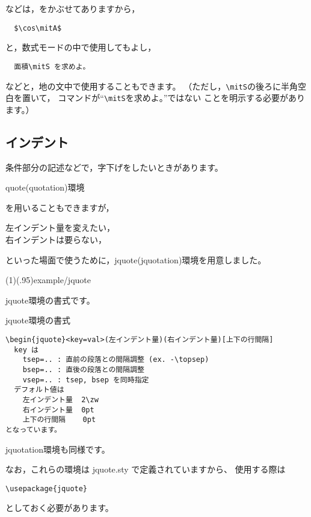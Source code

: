 \documentclass[fleqn,a4j]{jarticle}
\begin{document}
などは，をかぶせてありますから，
\begin{jquote}
\begin{verbatim}
  $\cos\mitA$
\end{verbatim}
\end{jquote}
と，数式モードの中で使用してもよし，
\begin{jquote}
\begin{verbatim}
  面積\mitS を求めよ。
\end{verbatim}
\end{jquote}
などと，地の文中で使用することもできます。
（ただし，\verb+\mitS+の後ろに半角空白を置いて，
コマンドが``\verb+\mitS+\!を求めよ。''ではない
ことを明示する必要があります。）

\subsection{インデント\label{L-jquote}}
条件部分の記述などで，字下げをしたいときがあります。\par
\centerline{\textsf{quote(quotation)}環境}
を用いることもできますが，
\begin{jquote}
    左インデント量を変えたい，\\
    右インデントは要らない，
\end{jquote}
といった場面で使うために，\textsf{jquote(jquotation)}環境を用意しました。

\showexample[jquote](1)(.95){example/jquote}
%

\textsf{jquote}環境の書式です。

\begin{itemsquarebox}{\textsf{jquote}環境の書式}
\begin{verbatim}
\begin{jquote}<key=val>(左インデント量)(右インデント量)[上下の行間隔]
  key は
    tsep=.. : 直前の段落との間隔調整 (ex. -\topsep)
    bsep=.. : 直後の段落との間隔調整
    vsep=.. : tsep, bsep を同時指定
  デフォルト値は
    左インデント量  2\zw
    右インデント量  0pt
    上下の行間隔    0pt
となっています。
\end{verbatim}
\end{itemsquarebox}

\textsf{jquotation}環境も同様です。

なお，これらの環境は \textsf{jquote.sty} で定義されていますから、
使用する際は
\begin{jquote}
\begin{verbatim}
\usepackage{jquote}
\end{verbatim}
\end{jquote}
としておく必要があります。
\end{document}
